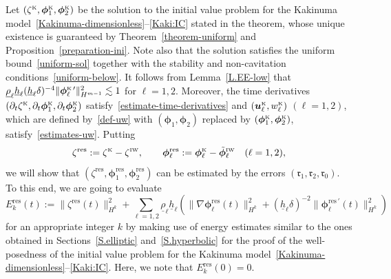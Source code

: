 \documentclass[11pt,leqno]{article}
\numberwithin{equation}{section}
\numberwithin{figure}{section}
\begin{document}
Let $(\zeta^{\mbox{\rm\tiny K}},\bm{\phi}_1^{\mbox{\rm\tiny K}},\bm{\phi}_2^{\mbox{\rm\tiny K}})$ be the solution 
to the initial value problem for the Kakinuma model~\eqref{Kakinuma-dimensionless}--\eqref{Kaki:IC} stated in the theorem, whose unique existence is guaranteed by 
Theorem~\ref{theorem-uniform} and Proposition~\ref{preparation-ini}. 
Note also that the solution satisfies the uniform bound~\eqref{uniform-sol} together with the stability and 
non-cavitation conditions~\eqref{uniform-below}. 
It follows from Lemma~\ref{L.EE-low} that $\underline{\rho}_\ell\underline{h}_\ell(\underline{h}_\ell\delta)^{-4}
 \|\bm{\phi}_\ell^{\mbox{\rm\tiny K} \, \prime}\|_{H^{m-1}}^2 \lesssim 1$ for $\ell=1,2$. 
Moreover, the time derivatives 
$(\partial_t\zeta^{\mbox{\rm\tiny K}},\partial_t\bm{\phi}_1^{\mbox{\rm\tiny K}},\partial_t\bm{\phi}_2^{\mbox{\rm\tiny K}})$ 
satisfy~\eqref{estimate-time-derivatives} and $(\bm{u}_\ell^{\mbox{\rm\tiny K}},w_\ell^{\mbox{\rm\tiny K}})$ $(\ell=1,2)$,
which are defined by~\eqref{def-uw} with $(\bm{\phi}_1,\bm{\phi}_2)$ replaced by 
$({\bm{\phi}}_1^{\mbox{\rm\tiny K}},{\bm{\phi}}_2^{\mbox{\rm\tiny K}})$, satisfy~\eqref{estimates-uw}. 
Putting
%
\[
\zeta^\mathrm{res} := \zeta^{\mbox{\rm\tiny K}}-\zeta^{\mbox{\rm\tiny IW}}, \qquad
\bm{\phi}_\ell^\mathrm{res} := \bm{\phi}_\ell^{\mbox{\rm\tiny K}} - \tilde{\bm{\phi}}_\ell^{\mbox{\rm\tiny IW}} \quad
(\ell=1,2),
\]
%
we will show that $(\zeta^\mathrm{res},\bm{\phi}_1^\mathrm{res},\bm{\phi}_2^\mathrm{res})$ can be estimated 
by the errors $(\bm{\mathfrak{r}}_1,\bm{\mathfrak{r}}_2,\mathfrak{r}_0)$. 
To this end, we are going to evaluate 
%
\[
E_k^\mathrm{res}(t)
:= \|\zeta^\mathrm{res}(t)\|_{H^k}^2 + \sum_{\ell=1,2} \underline{\rho}_\ell \underline{h}_\ell
 ( \|\nabla\bm{\phi}_\ell^\mathrm{res}(t)\|_{H^k}^2
  + (\underline{h}_\ell\delta)^{-2}\|\bm{\phi}_\ell^{\mathrm{res}\, \prime}(t)\|_{H^k}^2 )
\]
%
for an appropriate integer $k$ by making use of energy estimates similar to the ones obtained in Sections~\ref{S.elliptic} 
and~\ref{S.hyperbolic} for the proof of the well-posedness of the initial value problem for the Kakinuma model~\eqref{Kakinuma-dimensionless}--\eqref{Kaki:IC}.
Here, we note that $E_k^\mathrm{res}(0)=0$. 
\end{document}
